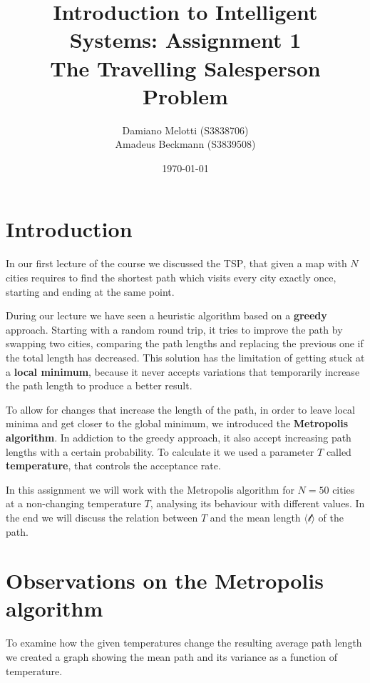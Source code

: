 \documentclass[a4paper]{article}
\title{Introduction to Intelligent Systems: Assignment 1
\\The Travelling Salesperson Problem}
\author{Damiano Melotti (S3838706)\\Amadeus Beckmann (S3839508) }
\date{\today}
\begin{document}
\maketitle

\section{Introduction}

In our first lecture of the course we discussed the \textsc{TSP}, that given a map with \(N\) cities requires to find the shortest path which visits every city exactly once, starting and ending at the same point. 

During our lecture we have seen a heuristic algorithm based on a \textbf{greedy} approach. Starting with a random round trip, it tries to improve the path by swapping two cities, comparing the path lengths and replacing the previous one if the total length has decreased. This solution has the limitation of getting stuck at a \textbf{local minimum}, because it never accepts variations that temporarily increase the path length to produce a better result.

To allow for changes that increase the length of the path, in order to leave local minima and get closer to the global minimum, we introduced the \textbf{Metropolis algorithm}. In addiction to the greedy approach, it also accept increasing path lengths with a certain probability. To calculate it we used a parameter \(T\) called \textbf{temperature}, that controls the acceptance rate.

In this assignment we will work with the Metropolis algorithm for \(N=50\) cities at a non-changing temperature \(T\), analysing its behaviour with different values. In the end we will discuss the relation between \(T\) and the mean length \(\langle \mathscr{l} \rangle\) of the path. 


\section{Observations on the Metropolis algorithm}

To examine how the given temperatures change the resulting average path length we created a graph showing the mean path and its variance as a function of temperature.
\end{document}
